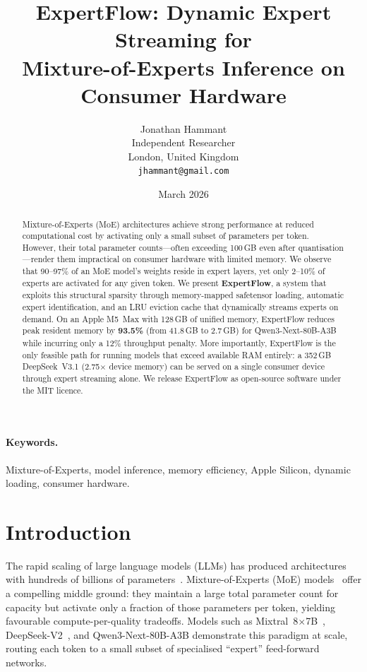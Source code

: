 \documentclass[11pt,a4paper]{article}
\title{ExpertFlow: Dynamic Expert Streaming for\\
Mixture-of-Experts Inference on Consumer Hardware}
\author{
  Jonathan Hammant\\
  Independent Researcher\\
  London, United Kingdom\\
  \texttt{jhammant@gmail.com}
}
\date{March 2026}
\begin{document}
\maketitle

\begin{abstract}
Mixture-of-Experts (MoE) architectures achieve strong performance at reduced
computational cost by activating only a small subset of parameters per token.
However, their total parameter counts---often exceeding 100\,GB even after
quantisation---render them impractical on consumer hardware with limited
memory. We observe that 90--97\% of an MoE model's weights reside in expert
layers, yet only 2--10\% of experts are activated for any given token. We
present \textbf{ExpertFlow}, a system that exploits this structural sparsity
through memory-mapped safetensor loading, automatic expert identification, and
an LRU eviction cache that dynamically streams experts on demand. On an Apple
M5~Max with 128\,GB of unified memory, ExpertFlow reduces peak resident memory
by \textbf{93.5\%} (from 41.8\,GB to 2.7\,GB) for Qwen3-Next-80B-A3B while
incurring only a 12\% throughput penalty. More importantly, ExpertFlow is the
only feasible path for running models that exceed available RAM entirely: a
352\,GB DeepSeek~V3.1 (2.75$\times$ device memory) can be served on
a single consumer device through expert streaming alone. We release ExpertFlow
as open-source software under the MIT licence.
\end{abstract}

\paragraph{Keywords.} Mixture-of-Experts, model inference, memory efficiency,
Apple Silicon, dynamic loading, consumer hardware.

\section{Introduction}
\label{sec:intro}

The rapid scaling of large language models (LLMs) has produced architectures
with hundreds of billions of parameters~\citep{chowdhery2022palm,
touvron2023llama2}. Mixture-of-Experts (MoE) models~\citep{shazeer2017outrageously,
fedus2022switch} offer a compelling middle ground: they maintain a large total
parameter count for capacity but activate only a fraction of those parameters
per token, yielding favourable compute-per-quality tradeoffs. Models such as
Mixtral~8$\times$7B~\citep{jiang2024mixtral}, DeepSeek-V2~\citep{deepseekv2},
and Qwen3-Next-80B-A3B demonstrate this paradigm at scale, routing each token
to a small subset of specialised ``expert'' feed-forward networks.
\end{document}
